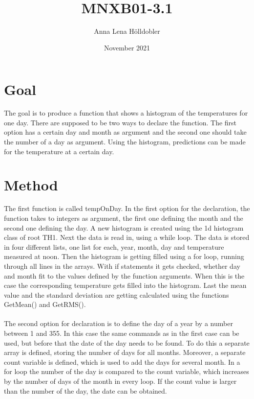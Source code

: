 \documentclass{article}
\title{MNXB01-3.1}
\author{Anna Lena Hölldobler}
\date{November 2021}
\begin{document}
\maketitle

\section*{Goal}
The goal is to produce a function that shows a histogram of the temperatures for one day. There are supposed to be two ways to declare the function. The first option has a certain day and month as argument and the second one should take the number of a day as argument. Using the histogram, predictions can be made for the temperature at a certain day.

\section*{Method}
The first function is called tempOnDay. In the first option for the declaration, the function takes to integers as argument, the first one defining the month and the second one defining the day. A new histogram is created using the 1d histogram class of root TH1. Next the data is read in, using a while loop. The data is stored in four different lists, one list for each, year, month, day and temperature measured at noon. Then the histogram is getting filled using a for loop, running through all lines in the arrays. With if statements it gets checked, whether day and month fit to the values defined by the function arguments. When this is the case the corresponding temperature gets filled into the histogram. Last the mean value and the standard deviation are getting calculated using the functions GetMean() and GetRMS().\\\\
The second option for declaration is to define the day of a year by a number between 1 and 355. In this case the same commands as in the first case can be used, but before that the date of the day needs to be found. To do this a separate array is defined, storing the number of days for all months. Moreover, a separate count variable is defined, which is used to add the days for several month. In a for loop the number of the day is compared to the count variable, which increases by the number of days of the month in every loop. If the count value is larger than the number of the day, the date can be obtained.
\end{document}
